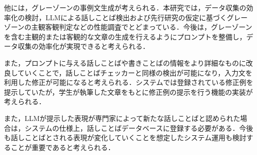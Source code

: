 他には，グレーゾーンの事例文生成が考えられる．本研究では，データ収集の効率化の検討，LLMによる話しことば検出および先行研究の仮定に基づくグレーゾーンの主観客観判定などの性能調査でとどまっている．今後は，グレーゾーンを含む主観的または客観的な文章の生成を行えるようにプロンプトを整備し，データ収集の効率化が実現できると考えられる．

また，プロンプトに与える話しことばや書きことばの情報をより詳細なものに改良していくことで，話しことばチェッカーと同様の検出が可能になり，入力文を利用した修正が可能になると考えられる．システムでは登録されている修正例を提示していたが，学生が執筆した文章をもとに修正例の提示を行う機能の実装が考えられる．

また，LLMが提示した表現が専門家によって新たな話しことばと認められた場合は，システムの仕様上，話しことばデータベースに登録する必要がある．今後も話しことばとされる表現が変化していくことを想定したシステム運用も検討することが重要であると考えられる．

